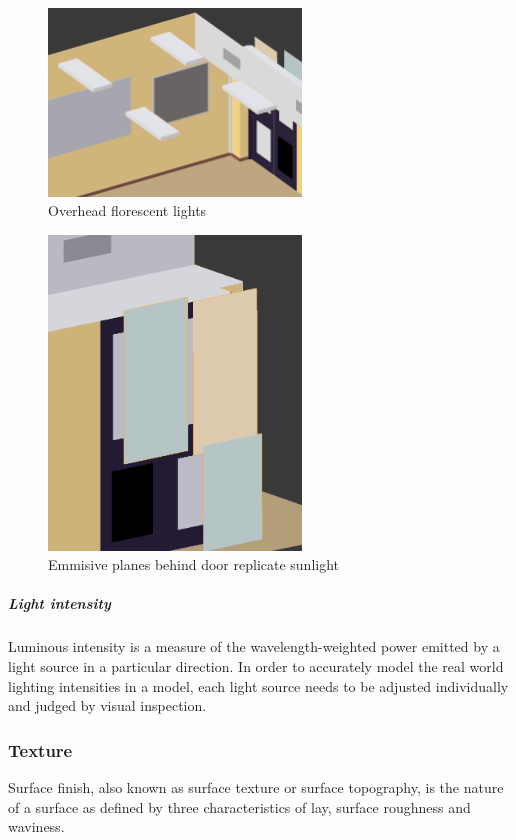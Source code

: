\documentclass[11pt,a4paper]{report}
\begin{document}
						\begin{figure}[H]
							\centering
							\includegraphics[width=0.6\textwidth]{overhead_lights}
							\caption{Overhead florescent lights}
						\end{figure}
						\begin{figure}[H]
							\centering
							\includegraphics[width=0.6\textwidth]{lights_behind_door}
							\caption{Emmisive planes behind door replicate sunlight}
						\end{figure}
					
					\subparagraph{Light intensity}
						Luminous intensity is a measure of the wavelength-weighted power emitted by a light source in a particular direction. In order to accurately model the real world lighting intensities in a model, each light source needs to be adjusted individually and judged by visual inspection. 
						
			\subsubsection{Texture}
				Surface finish, also known as surface texture or surface topography, is the nature of a surface as defined by three characteristics of lay, surface roughness and waviness.
				\cite{e._paul_degarmo_materials_2003}
					
\end{document}
